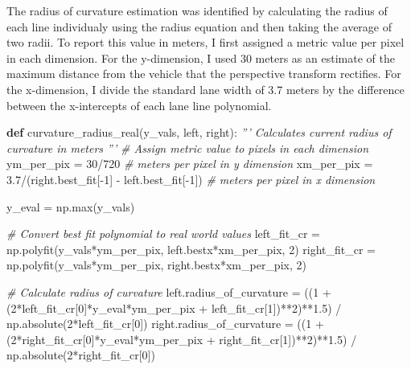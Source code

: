 \documentclass[11pt]{article}
\newenvironment{Shaded}{}{}
\newcommand{\KeywordTok}[1]{\textcolor[rgb]{0.00,0.44,0.13}{\textbf{{#1}}}}
\newcommand{\DecValTok}[1]{\textcolor[rgb]{0.25,0.63,0.44}{{#1}}}
\newcommand{\FloatTok}[1]{\textcolor[rgb]{0.25,0.63,0.44}{{#1}}}
\newcommand{\CommentTok}[1]{\textcolor[rgb]{0.38,0.63,0.69}{\textit{{#1}}}}
\newcommand{\NormalTok}[1]{{#1}}
\newcommand{\OperatorTok}[1]{\textcolor[rgb]{0.40,0.40,0.40}{{#1}}}
\newcommand{\BuiltInTok}[1]{{#1}}
\begin{document}
The radius of curvature estimation was identified by calculating the
radius of each line individualy using the radius equation and then
taking the average of two radii. To report this value in meters, I first
assigned a metric value per pixel in each dimension. For the
y-dimension, I used 30 meters as an estimate of the maximum distance
from the vehicle that the perspective transform rectifies. For the
x-dimension, I divide the standard lane width of 3.7 meters by the
difference between the x-intercepts of each lane line polynomial.

\begin{Shaded}
\begin{Highlighting}[]
\KeywordTok{def}\NormalTok{ curvature_radius_real(y_vals, left, right):}
    \CommentTok{''' Calculates current radius of curvature in meters '''}
    \CommentTok{# Assign metric value to pixels in each dimension}
\NormalTok{    ym_per_pix }\OperatorTok{=} \DecValTok{30}\OperatorTok{/}\DecValTok{720}  \CommentTok{# meters per pixel in y dimension}
\NormalTok{    xm_per_pix }\OperatorTok{=} \FloatTok{3.7}\OperatorTok{/}\NormalTok{(right.best_fit[}\OperatorTok{-}\DecValTok{1}\NormalTok{] }\OperatorTok{-}\NormalTok{ left.best_fit[}\OperatorTok{-}\DecValTok{1}\NormalTok{]) }\CommentTok{# meters per pixel in x dimension}
    
\NormalTok{    y_eval }\OperatorTok{=}\NormalTok{ np.}\BuiltInTok{max}\NormalTok{(y_vals)}
    
    \CommentTok{# Convert best fit polynomial to real world values}
\NormalTok{    left_fit_cr }\OperatorTok{=}\NormalTok{ np.polyfit(y_vals}\OperatorTok{*}\NormalTok{ym_per_pix, left.bestx}\OperatorTok{*}\NormalTok{xm_per_pix, }\DecValTok{2}\NormalTok{)}
\NormalTok{    right_fit_cr }\OperatorTok{=}\NormalTok{ np.polyfit(y_vals}\OperatorTok{*}\NormalTok{ym_per_pix, right.bestx}\OperatorTok{*}\NormalTok{xm_per_pix, }\DecValTok{2}\NormalTok{)}
    
    \CommentTok{# Calculate radius of curvature}
\NormalTok{    left.radius_of_curvature }\OperatorTok{=}\NormalTok{ ((}\DecValTok{1} \OperatorTok{+}\NormalTok{ (}\DecValTok{2}\OperatorTok{*}\NormalTok{left_fit_cr[}\DecValTok{0}\NormalTok{]}\OperatorTok{*}\NormalTok{y_eval}\OperatorTok{*}\NormalTok{ym_per_pix }\OperatorTok{+}\NormalTok{ left_fit_cr[}\DecValTok{1}\NormalTok{])}\OperatorTok{**}\DecValTok{2}\NormalTok{)}\OperatorTok{**}\FloatTok{1.5}\NormalTok{) }\OperatorTok{/}\NormalTok{ np.absolute(}\DecValTok{2}\OperatorTok{*}\NormalTok{left_fit_cr[}\DecValTok{0}\NormalTok{])}
\NormalTok{    right.radius_of_curvature }\OperatorTok{=}\NormalTok{ ((}\DecValTok{1} \OperatorTok{+}\NormalTok{ (}\DecValTok{2}\OperatorTok{*}\NormalTok{right_fit_cr[}\DecValTok{0}\NormalTok{]}\OperatorTok{*}\NormalTok{y_eval}\OperatorTok{*}\NormalTok{ym_per_pix }\OperatorTok{+}\NormalTok{ right_fit_cr[}\DecValTok{1}\NormalTok{])}\OperatorTok{**}\DecValTok{2}\NormalTok{)}\OperatorTok{**}\FloatTok{1.5}\NormalTok{) }\OperatorTok{/}\NormalTok{ np.absolute(}\DecValTok{2}\OperatorTok{*}\NormalTok{right_fit_cr[}\DecValTok{0}\NormalTok{])}
\end{Highlighting}
\end{Shaded}
\end{document}

